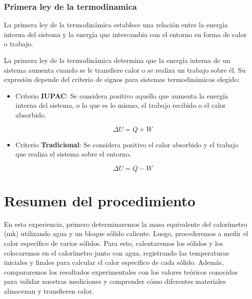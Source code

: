 \documentclass[twocolumn, 12pt]{article}
\begin{document}
\subsubsection{Primera ley de la termodinamica~\cite{Fernández_1}}

La primera ley de la termodinámica establece una relación
entre la energía interna del sistema y la energía que
intercambia con el entorno en forma de calor o trabajo.

La primera ley de la termodinámica determina que la energía
interna de un sistema aumenta cuando se le transfiere calor
o se realiza un trabajo sobre él. Su expresión depende del
criterio de signos para sistemas termodinámicos elegido:

\begin{itemize}
    \item Criterio \textbf{IUPAC}: Se considera positivo aquello que
          aumenta la energía interna del sistema, o lo que es lo
          mismo, el trabajo recibido o el calor absorbido.

          \begin{equation*}
              \Delta U = Q + W
          \end{equation*}

    \item Criterio \textbf{Tradicional}: Se considera positivo el
          calor absorbido y el trabajo que realiza el sistema sobre
          el entorno.

          \begin{equation*}
              \Delta U = Q - W
          \end{equation*}
\end{itemize}

\section{Resumen del procedimiento}

En esta experiencia, primero determinaremos la masa
equivalente del calorímetro (mk) utilizando agua y un
bloque sólido caliente. Luego, procederemos a medir el
calor específico de varios sólidos. Para esto, calentaremos
los sólidos y los colocaremos en el calorímetro junto con
agua, registrando las temperaturas iniciales y finales para
calcular el calor específico de cada sólido. Además,
compararemos los resultados experimentales con los valores
teóricos conocidos para validar nuestras mediciones y
comprender cómo diferentes materiales almacenan y
transfieren calor.

\printbibliography
\end{document}
